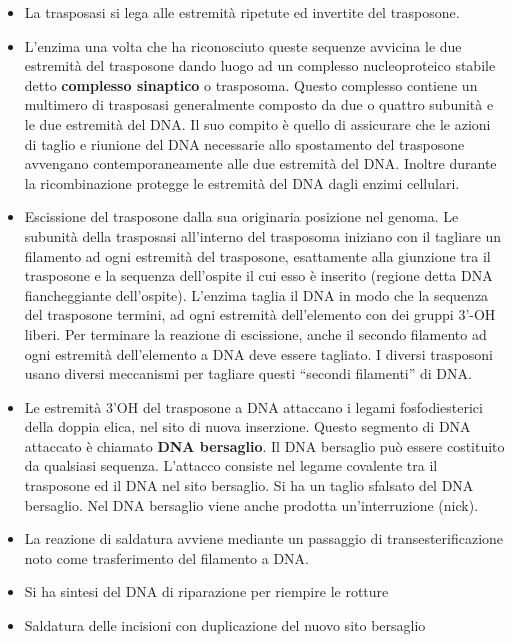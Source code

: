 \documentclass[11pt]{book}
\begin{document}
\begin{itemize}
\itemsep1pt\parskip0pt
\item
  La trasposasi si lega alle estremità ripetute ed invertite del
  trasposone.
\item
  L'enzima una volta che ha riconosciuto queste sequenze avvicina le
  due estremità del trasposone dando luogo ad un complesso
  nucleoproteico stabile detto \textbf{complesso sinaptico} o
  trasposoma. Questo complesso contiene un multimero di trasposasi
  generalmente composto da due o quattro subunità e le due estremità
  del DNA. Il suo compito è quello di assicurare che le azioni di
  taglio e riunione del DNA necessarie allo spostamento del trasposone
  avvengano contemporaneamente alle due estremità del DNA. Inoltre
  durante la ricombinazione protegge le estremità del DNA dagli enzimi
  cellulari.
\item
  Escissione del trasposone dalla sua originaria posizione nel genoma.
  Le subunità della trasposasi all'interno del trasposoma iniziano con
  il tagliare un filamento ad ogni estremità del trasposone,
  esattamente alla giunzione tra il trasposone e la sequenza
  dell'ospite il cui esso è inserito (regione detta DNA fiancheggiante
  dell'ospite). L'enzima taglia il DNA in modo che la sequenza del
  trasposone termini, ad ogni estremità dell'elemento con dei gruppi
  3'-OH liberi. Per terminare la reazione di escissione, anche il
  secondo filamento ad ogni estremità dell'elemento a DNA deve essere
  tagliato. I diversi trasposoni usano diversi meccanismi per tagliare
  questi ``secondi filamenti'' di DNA.
\item
  Le estremità 3'OH del trasposone a DNA attaccano i legami
  fosfodiesterici della doppia elica, nel sito di nuova inserzione.
  Questo segmento di DNA attaccato è chiamato \textbf{DNA bersaglio}.
  Il DNA bersaglio può essere costituito da qualsiasi sequenza.
  L'attacco consiste nel legame covalente tra il trasposone ed il DNA
  nel sito bersaglio. Si ha un taglio sfalsato del DNA bersaglio. Nel
  DNA bersaglio viene anche prodotta un'interruzione (nick).
\item
  La reazione di saldatura avviene mediante un passaggio di
  transesterificazione noto come trasferimento del filamento a DNA.
\item
  Si ha sintesi del DNA di riparazione per riempire le rotture
\item
  Saldatura delle incisioni con duplicazione del nuovo sito bersaglio
  \end{itemize}
\end{document}
